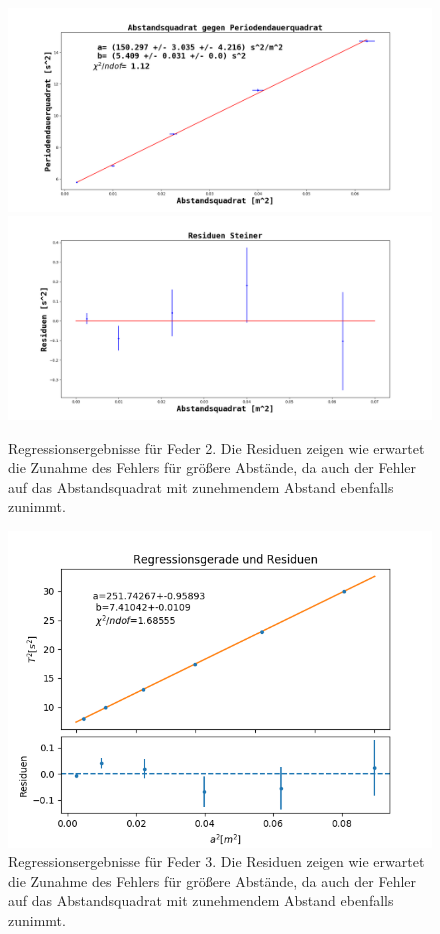 \documentclass[12pt,a4paper]{article}
\begin{document}
\begin{figure}
\begin{center}
\includegraphics[scale=0.3]{Bilder/Steiner_Feder2_linReg}
\includegraphics[scale=0.3]{Bilder/Steiner_Feder2_Residuen}
\end{center}
\caption{Regressionsergebnisse für Feder 2. Die Residuen zeigen wie erwartet die Zunahme des Fehlers für größere Abstände, da auch der Fehler auf das Abstandsquadrat mit zunehmendem Abstand ebenfalls zunimmt.}
\label{fig:SteinerReg2}
\end{figure}

\begin{figure}
\begin{center}
\includegraphics[scale=0.8]{Bilder/SteinerFeder3Komplett}
\end{center}
\caption{Regressionsergebnisse für Feder 3. Die Residuen zeigen wie erwartet die Zunahme des Fehlers für größere Abstände, da auch der Fehler auf das Abstandsquadrat mit zunehmendem Abstand ebenfalls zunimmt.}
\label{fig:SteinerReg3}
\end{figure}
\end{document}

